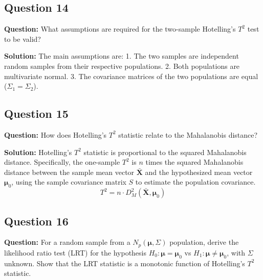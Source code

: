 \subsection*{Question 14}
\textbf{Question:} What assumptions are required for the two-sample Hotelling's $T^2$ test to be valid?

\textbf{Solution:}
The main assumptions are:
1.  The two samples are independent random samples from their respective populations.
2.  Both populations are multivariate normal.
3.  The covariance matrices of the two populations are equal ($\Sigma_1 = \Sigma_2$).

\subsection*{Question 15}
\textbf{Question:} How does Hotelling's $T^2$ statistic relate to the Mahalanobis distance?

\textbf{Solution:}
Hotelling's $T^2$ statistic is proportional to the squared Mahalanobis distance. Specifically, the one-sample $T^2$ is $n$ times the squared Mahalanobis distance between the sample mean vector $\bar{\mathbf{X}}$ and the hypothesized mean vector $\boldsymbol{\mu}_0$, using the sample covariance matrix $S$ to estimate the population covariance.
$$ T^2 = n \cdot D_M^2(\bar{\mathbf{X}}, \boldsymbol{\mu}_0) $$

\subsection*{Question 16}
\textbf{Question:} For a random sample from a $N_p(\boldsymbol{\mu}, \Sigma)$ population, derive the likelihood ratio test (LRT) for the hypothesis $H_0: \boldsymbol{\mu} = \boldsymbol{\mu}_0$ vs $H_1: \boldsymbol{\mu} \neq \boldsymbol{\mu}_0$, with $\Sigma$ unknown. Show that the LRT statistic is a monotonic function of Hotelling's $T^2$ statistic.

